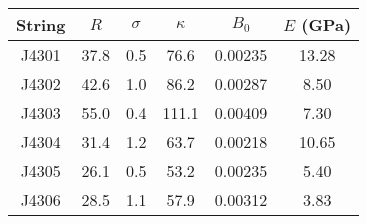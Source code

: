 \begin{tabular}{cccccc}
\toprule
String & $R$ & $\sigma$ & $\kappa$ & $B_0$ & $E$ (GPa) \\
\midrule
J4301 & 37.8 & 0.5 & 76.6 & 0.00235 & 13.28 \\
J4302 & 42.6 & 1.0 & 86.2 & 0.00287 & 8.50 \\
J4303 & 55.0 & 0.4 & 111.1 & 0.00409 & 7.30 \\
J4304 & 31.4 & 1.2 & 63.7 & 0.00218 & 10.65 \\
J4305 & 26.1 & 0.5 & 53.2 & 0.00235 & 5.40 \\
J4306 & 28.5 & 1.1 & 57.9 & 0.00312 & 3.83 \\
\bottomrule
\end{tabular}

